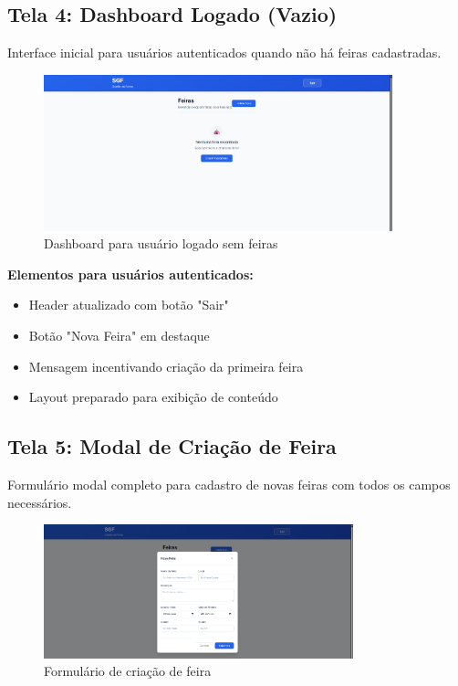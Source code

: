 \documentclass[12pt,a4paper]{article}
\begin{document}
\subsection{Tela 4: Dashboard Logado (Vazio)}

Interface inicial para usuários autenticados quando não há feiras cadastradas.

\begin{figure}[H]
\centering
\includegraphics[width=0.9\textwidth]{wireframes/04_dashboard_logado_vazio.png}
\caption{Dashboard para usuário logado sem feiras}
\label{fig:dashboard_vazio}
\end{figure}

\textbf{Elementos para usuários autenticados:}
\begin{itemize}
    \item Header atualizado com botão "Sair"
    \item Botão "Nova Feira" em destaque
    \item Mensagem incentivando criação da primeira feira
    \item Layout preparado para exibição de conteúdo
\end{itemize}

\subsection{Tela 5: Modal de Criação de Feira}

Formulário modal completo para cadastro de novas feiras com todos os campos necessários.

\begin{figure}[H]
\centering
\includegraphics[width=0.8\textwidth]{wireframes/05_modal_criar_feira.png}
\caption{Formulário de criação de feira}
\label{fig:criar_feira}
\end{figure}
\end{document}
